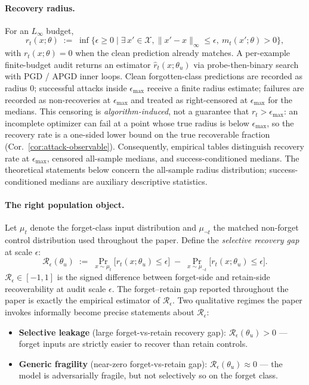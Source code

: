 \paragraph{Recovery radius.} For an $L_\infty$ budget,
\begin{equation}
  r_t(x;\theta) \;:=\; \inf\bigl\{\epsilon \geq 0 \mid \exists\, x' \in \mathcal{X}, \|x' - x\|_\infty \leq \epsilon,\ m_t(x';\theta) > 0\bigr\},
\end{equation}
with $r_t(x;\theta) = 0$ when the clean prediction already matches. A
per-example finite-budget audit returns an estimator $\hat r_t(x;\theta_u)$ via
probe-then-binary search with PGD / APGD inner loops. Clean forgotten-class
predictions are recorded as radius $0$; successful attacks inside
$\epsilon_{\max}$ receive a finite radius estimate; failures are recorded as
non-recoveries at $\epsilon_{\max}$ and treated as right-censored at
$\epsilon_{\max}$ for the medians. This censoring is \emph{algorithm-induced},
not a guarantee that $r_t>\epsilon_{\max}$: an incomplete optimizer can fail at a
point whose true radius is below $\epsilon_{\max}$, so the recovery rate is a
one-sided lower bound on the true recoverable fraction (Cor.~\ref{cor:attack-observable}).
Consequently, empirical tables distinguish
recovery rate at $\epsilon_{\max}$, censored all-sample medians, and
success-conditioned medians. The theoretical statements below concern the
all-sample radius distribution; success-conditioned medians are auxiliary
descriptive statistics.

\paragraph{The right population object.} Let $\mu_t$ denote the
forget-class input distribution and $\mu_{\neg t}$ the matched non-forget
control distribution used throughout the paper. Define the
\emph{selective recovery gap} at scale $\epsilon$:
\begin{equation}
  \boxed{\;\mathcal{R}_\epsilon(\theta_u)
  \;:=\;
  \Pr_{x \sim \mu_t}\!\bigl[r_t(x;\theta_u) \leq \epsilon\bigr]
  \;-\;
  \Pr_{x \sim \mu_{\neg t}}\!\bigl[r_t(x;\theta_u) \leq \epsilon\bigr].\;}
  \label{eq:rfcc}
\end{equation}
$\mathcal{R}_\epsilon \in [-1,1]$ is the signed difference between forget-side
and retain-side recoverability at audit scale $\epsilon$. The forget--retain
gap reported throughout the paper is exactly the empirical estimator of
$\mathcal{R}_\epsilon$. Two qualitative regimes the paper invokes informally
become precise statements about $\mathcal{R}_\epsilon$:
\begin{itemize}[leftmargin=1.5em,topsep=0pt]
  \item \textbf{Selective leakage} (large forget-vs-retain recovery gap):
    $\mathcal{R}_\epsilon(\theta_u) > 0$ --- forget inputs are strictly easier
    to recover than retain controls.
  \item \textbf{Generic fragility} (near-zero forget-vs-retain gap):
    $\mathcal{R}_\epsilon(\theta_u) \approx 0$ --- the model is adversarially
    fragile, but not selectively so on the forget class.
\end{itemize}

